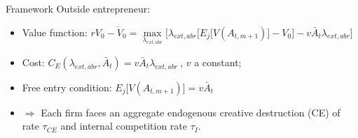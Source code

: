 \documentclass[11pt]{beamer}
\begin{document}
\begin{frame}{Framework}
Outside entrepreneur:
	\begin{itemize}\itemsep12pt	
	\item Value function: $rV_0 - \dot{V}_0 = \max\limits_{\lambda_{ext, abr}}\big[\lambda_{ext, abr}\big[E_j\big[V(A_{t, m+1})\big] - V_0\big] - v \bar{A}_{t}\lambda_{ext, abr}\big]$
 	\item Cost: $C_E(\lambda_{ext, abr}, \bar{A}_{t}) = v \bar{A}_{t} \lambda_{ext, abr}\:$, $v$ a constant;
	\item Free entry condition: $E_j\big[V(A_{t, m+1})\big] = v \bar{A}_{t}$
	\item $\Rightarrow$ Each firm faces an aggregate endogenous creative destruction (CE) of rate $\tau_{CE}$ and internal competition rate $\tau_I$.
	\end{itemize}
\end{frame}
\end{document}
